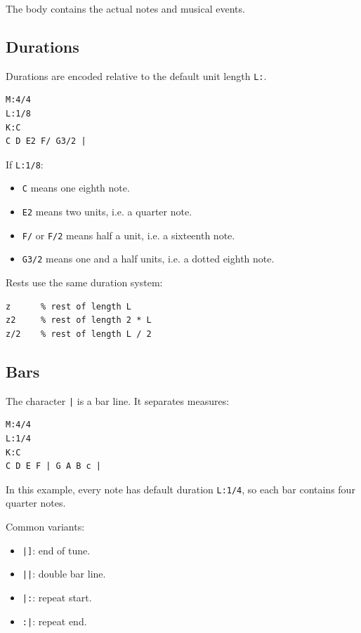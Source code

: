 \documentclass[11pt]{article}
\begin{document}
The body contains the actual notes and musical events.

\subsection{Durations}

Durations are encoded relative to the default unit length \verb|L:|.

\begin{verbatim}
M:4/4
L:1/8
K:C
C D E2 F/ G3/2 |
\end{verbatim}

If \verb|L:1/8|:

\begin{itemize}[leftmargin=*]
  \item \verb|C| means one eighth note.
  \item \verb|E2| means two units, i.e. a quarter note.
  \item \verb|F/| or \verb|F/2| means half a unit, i.e. a sixteenth note.
  \item \verb|G3/2| means one and a half units, i.e. a dotted eighth note.
\end{itemize}

Rests use the same duration system:

\begin{verbatim}
z      % rest of length L
z2     % rest of length 2 * L
z/2    % rest of length L / 2
\end{verbatim}

\subsection{Bars}

The character \verb+|+ is a bar line. It separates measures:

\begin{verbatim}
M:4/4
L:1/4
K:C
C D E F | G A B c |
\end{verbatim}

In this example, every note has default duration \verb|L:1/4|, so each bar
contains four quarter notes.

Common variants:

\begin{itemize}[leftmargin=*]
  \item \verb+|]+: end of tune.
  \item \verb+||+: double bar line.
  \item \verb+|:+: repeat start.
  \item \verb+:|+: repeat end.
\end{itemize}
\end{document}
